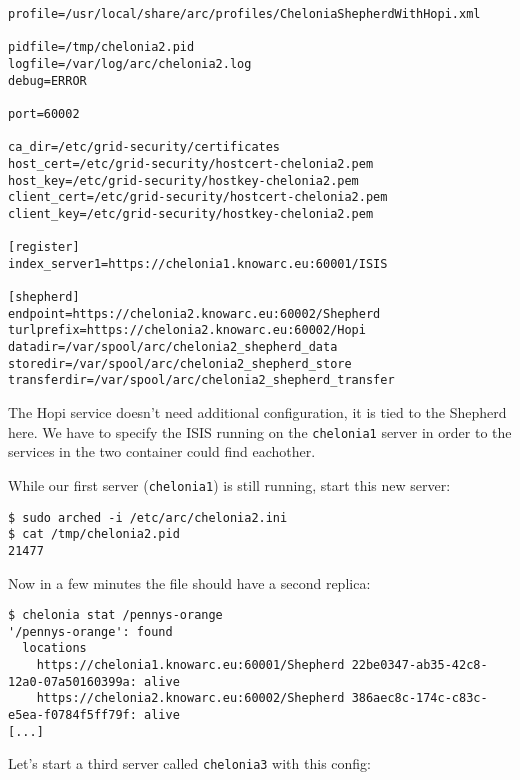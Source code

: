 \documentclass{article}
\begin{document}
\begin{verbatim}
profile=/usr/local/share/arc/profiles/CheloniaShepherdWithHopi.xml

pidfile=/tmp/chelonia2.pid
logfile=/var/log/arc/chelonia2.log
debug=ERROR

port=60002

ca_dir=/etc/grid-security/certificates
host_cert=/etc/grid-security/hostcert-chelonia2.pem
host_key=/etc/grid-security/hostkey-chelonia2.pem
client_cert=/etc/grid-security/hostcert-chelonia2.pem
client_key=/etc/grid-security/hostkey-chelonia2.pem

[register]
index_server1=https://chelonia1.knowarc.eu:60001/ISIS

[shepherd]
endpoint=https://chelonia2.knowarc.eu:60002/Shepherd
turlprefix=https://chelonia2.knowarc.eu:60002/Hopi
datadir=/var/spool/arc/chelonia2_shepherd_data
storedir=/var/spool/arc/chelonia2_shepherd_store
transferdir=/var/spool/arc/chelonia2_shepherd_transfer
\end{verbatim}

The Hopi service doesn't need additional configuration, it is tied to the Shepherd here. We have to specify the ISIS running on the \verb!chelonia1! server in order to the services in the two container could find eachother.

While our first server (\verb!chelonia1!) is still running, start this new server:

\begin{verbatim}
$ sudo arched -i /etc/arc/chelonia2.ini
$ cat /tmp/chelonia2.pid
21477
\end{verbatim}

Now in a few minutes the file should have a second replica:

\begin{verbatim}
$ chelonia stat /pennys-orange
'/pennys-orange': found
  locations
    https://chelonia1.knowarc.eu:60001/Shepherd 22be0347-ab35-42c8-12a0-07a50160399a: alive
    https://chelonia2.knowarc.eu:60002/Shepherd 386aec8c-174c-c83c-e5ea-f0784f5ff79f: alive
[...]
\end{verbatim}

Let's start a third server called \verb!chelonia3! with this config:
\end{document}
